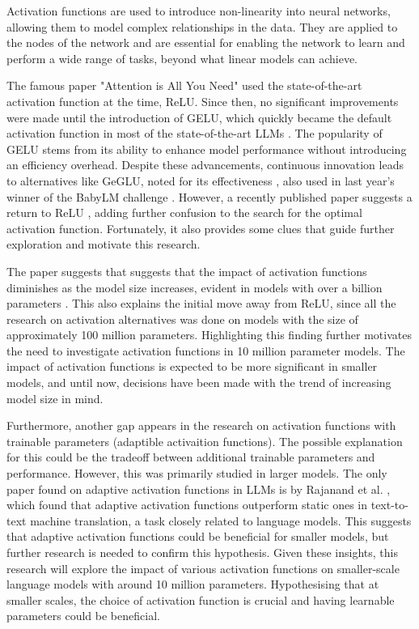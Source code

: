 Activation functions are used to introduce non-linearity into neural networks, allowing them to model complex relationships in the data. They are applied to the nodes of the network and are essential for enabling the network to learn and perform a wide range of tasks, beyond what linear models can achieve.

The famous paper "Attention is All You Need" \cite{Vaswani2017} used the state-of-the-art activation function at the time, ReLU. Since then, no significant improvements were made until the introduction of GELU, which quickly became the default activation function in most of the state-of-the-art LLMs \cite{Lee2023}. The popularity of GELU stems from its ability to enhance model performance without introducing an efficiency overhead. Despite these advancements, continuous innovation leads to alternatives like GeGLU, noted for its effectiveness \cite{Shazeer2020}, also used in last year's winner of the BabyLM challenge \cite{Samuel2023}. However, a recently published paper suggests a return to ReLU \cite{Mirzadeh2023}, adding further confusion to the search for the optimal activation function. Fortunately, it also provides some clues that guide further exploration and motivate this research.

The paper suggests that suggests that the impact of activation functions diminishes as the model size increases, evident in models with over a billion parameters \cite{Mirzadeh2023}. This also explains the initial move away from ReLU, since all the research on activation alternatives was done on models with the size of approximately 100 million parameters. Highlighting this finding further motivates the need to investigate activation functions in 10 million parameter models. The impact of activation functions is expected to be more significant in smaller models, and until now, decisions have been made with the trend of increasing model size in mind.

Furthermore, another gap appears in the research on activation functions with trainable parameters (adaptible activaition functions). The possible explanation for this could be the tradeoff between additional trainable parameters and performance. However, this was primarily studied in larger models. The only paper found on adaptive activation functions in LLMs is by Rajanand et al. \cite{Rajanand}, which found that adaptive activation functions outperform static ones in text-to-text machine translation, a task closely related to language models. This suggests that adaptive activation functions could be beneficial for smaller models, but further research is needed to confirm this hypothesis. Given these insights, this research will explore the impact of various activation functions on smaller-scale language models with around 10 million parameters. Hypothesising that at smaller scales, the choice of activation function is crucial and having learnable parameters could be beneficial.

